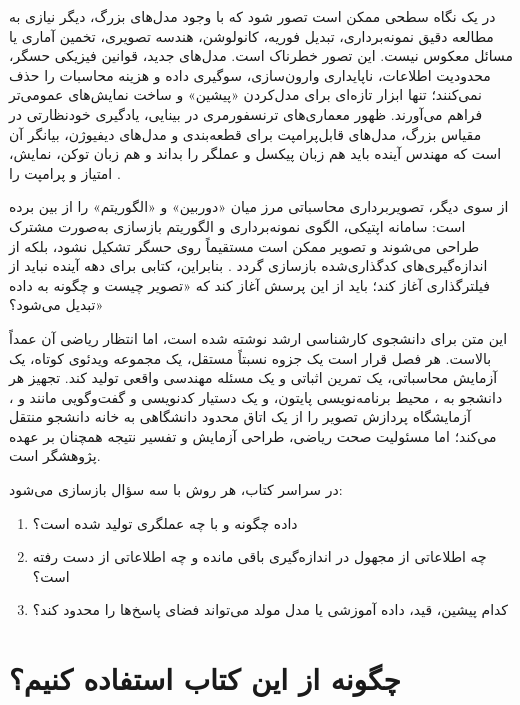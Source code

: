 \documentclass[12pt,openany,oneside]{book}
\begin{document}
در یک نگاه سطحی ممکن است تصور شود که با وجود مدل‌های بزرگ، دیگر نیازی به مطالعه دقیق
نمونه‌برداری، تبدیل فوریه، کانولوشن، هندسه تصویری، تخمین آماری یا مسائل معکوس نیست.
این تصور خطرناک است. مدل‌های جدید، قوانین فیزیکی حسگر، محدودیت اطلاعات، ناپایداری وارون‌سازی،
سوگیری داده و هزینه محاسبات را حذف نمی‌کنند؛ تنها ابزار تازه‌ای برای مدل‌کردن «پیشین» و
ساخت نمایش‌های عمومی‌تر فراهم می‌آورند. ظهور معماری‌های ترنسفورمری در بینایی،
یادگیری خودنظارتی در مقیاس بزرگ، مدل‌های قابل‌پرامپت برای قطعه‌بندی و مدل‌های دیفیوژن،
بیانگر آن است که مهندس آینده باید هم زبان پیکسل و عملگر را بداند و هم زبان توکن، نمایش،
امتیاز و پرامپت را \cite{dosovitskiy2021vit,he2022mae,kirillov2023sam,ho2020ddpm,oquab2024dinov2}.

از سوی دیگر، تصویربرداری محاسباتی مرز میان «دوربین» و «الگوریتم» را از بین برده است:
سامانه اپتیکی، الگوی نمونه‌برداری و الگوریتم بازسازی به‌صورت مشترک طراحی می‌شوند و تصویر
ممکن است مستقیماً روی حسگر تشکیل نشود، بلکه از اندازه‌گیری‌های کدگذاری‌شده بازسازی گردد
\cite{computationalimaging2026,zuo2022optical}. بنابراین، کتابی برای دهه آینده نباید از
فیلترگذاری آغاز کند؛ باید از این پرسش آغاز کند که «تصویر چیست و چگونه به داده تبدیل می‌شود؟»

این متن برای دانشجوی کارشناسی ارشد نوشته شده است، اما انتظار ریاضی آن عمداً بالاست.
هر فصل قرار است یک جزوه نسبتاً مستقل، یک مجموعه ویدئوی کوتاه، یک آزمایش محاسباتی،
یک تمرین اثباتی و یک مسئله مهندسی واقعی تولید کند. تجهیز هر دانشجو به
، محیط برنامه‌نویسی پایتون، و یک دستیار کدنویسی و گفت‌وگویی
مانند  و ، آزمایشگاه پردازش تصویر را از یک اتاق محدود دانشگاهی
به خانه دانشجو منتقل می‌کند؛ اما مسئولیت صحت ریاضی، طراحی آزمایش و تفسیر نتیجه همچنان
بر عهده پژوهشگر است.

\enlargethispage{3\baselineskip}
\begin{keybox}
در سراسر کتاب، هر روش با سه سؤال بازسازی می‌شود:
\begin{enumerate}
\item داده چگونه و با چه عملگری تولید شده است؟
\item چه اطلاعاتی از مجهول در اندازه‌گیری باقی مانده و چه اطلاعاتی از دست رفته است؟
\item کدام پیشین، قید، داده آموزشی یا مدل مولد می‌تواند فضای پاسخ‌ها را محدود کند؟
\end{enumerate}
\end{keybox}

\chapter*{چگونه از این کتاب استفاده کنیم؟}
\end{document}
